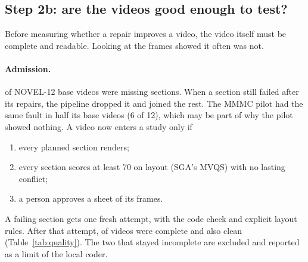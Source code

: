 \documentclass[11pt]{article}
\begin{document}


\subsection{Step 2b: are the videos good enough to test?}\label{sec:quality}

Before measuring whether a repair improves a video, the video itself must be complete and readable. Looking at the
frames showed it often was not.

\paragraph{Admission.} \AdmIncompleteBefore{} of \AdmTotal{} NOVEL-12 base videos were missing sections. When a
section still failed after its repairs, the pipeline dropped it and joined the rest. The MMMC pilot had the same
fault in half its base videos (6 of 12), which may be part of why the pilot showed nothing. A video now enters a study only if
\begin{enumerate}
  \item every planned section renders;
  \item every section scores at least 70 on layout (SGA's MVQS) with no lasting conflict;
  \item a person approves a sheet of its frames.
\end{enumerate}
A failing section gets one fresh attempt, with the code check and explicit layout rules. After that attempt,
\AdmComplete{} of \AdmTotal{} videos were complete and \AdmClean{} also clean (Table~\ref{tab:quality}). The two
that stayed incomplete are excluded and reported as a limit of the local coder.


\end{document}
